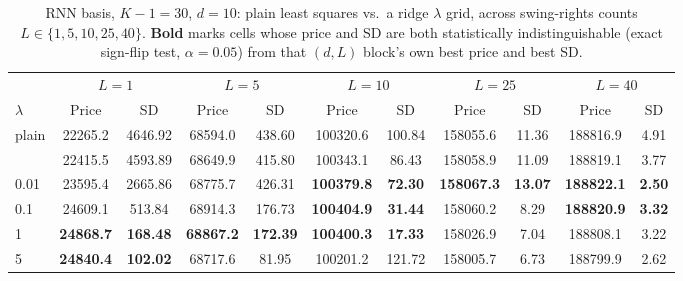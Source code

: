 \begin{table}[htbp]
\caption{\label{tab:rnn_ridge_lambda_L_sweep_K30_d10}RNN basis, $K-1=30$, $d=10$: plain least squares vs.\ a ridge $\lambda$ grid, across swing-rights counts $L \in \{1,5,10,25,40\}$. \textbf{Bold} marks cells whose price and SD are both statistically indistinguishable (exact sign-flip test, $\alpha=0.05$) from that $(d,L)$ block's own best price and best SD.}
\scriptsize
\setlength{\tabcolsep}{3pt}
\centering
\begin{tabular}[t]{lcccccccccc}
\toprule
\multicolumn{1}{c}{ } & \multicolumn{2}{c}{$L = 1$} & \multicolumn{2}{c}{$L = 5$} & \multicolumn{2}{c}{$L = 10$} & \multicolumn{2}{c}{$L = 25$} & \multicolumn{2}{c}{$L = 40$} \\
\cmidrule(l{3pt}r{3pt}){2-3} \cmidrule(l{3pt}r{3pt}){4-5} \cmidrule(l{3pt}r{3pt}){6-7} \cmidrule(l{3pt}r{3pt}){8-9} \cmidrule(l{3pt}r{3pt}){10-11}
$\lambda$ & Price & SD & Price & SD & Price & SD & Price & SD & Price & SD\\
\midrule
plain & 22265.2 & 4646.92 & 68594.0 & 438.60 & 100320.6 & 100.84 & 158055.6 & 11.36 & 188816.9 & 4.91\\
\addlinespace
0.001 & 22415.5 & 4593.89 & 68649.9 & 415.80 & 100343.1 & 86.43 & 158058.9 & 11.09 & 188819.1 & 3.77\\
0.01 & 23595.4 & 2665.86 & 68775.7 & 426.31 & \textbf{100379.8} & \textbf{72.30} & \textbf{158067.3} & \textbf{13.07} & \textbf{188822.1} & \textbf{2.50}\\
0.1 & 24609.1 & 513.84 & 68914.3 & 176.73 & \textbf{100404.9} & \textbf{31.44} & 158060.2 & 8.29 & \textbf{188820.9} & \textbf{3.32}\\
1 & \textbf{24868.7} & \textbf{168.48} & \textbf{68867.2} & \textbf{172.39} & \textbf{100400.3} & \textbf{17.33} & 158026.9 & 7.04 & 188808.1 & 3.22\\
5 & \textbf{24840.4} & \textbf{102.02} & 68717.6 & 81.95 & 100201.2 & 121.72 & 158005.7 & 6.73 & 188799.9 & 2.62\\
\bottomrule
\end{tabular}
\end{table}

